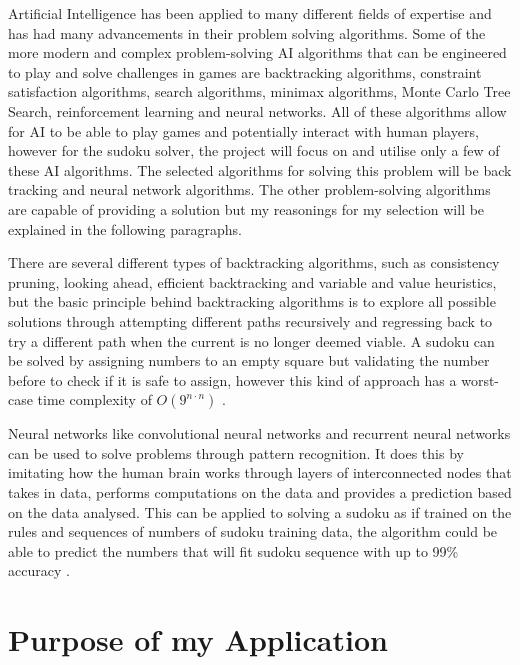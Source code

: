 \documentclass[]{final_report}
\begin{document}
Artificial Intelligence has been applied to many different fields of expertise and has had many advancements in their problem solving algorithms. Some of the more modern and complex problem-solving AI algorithms that can be engineered to play and solve challenges in games are backtracking algorithms, constraint satisfaction algorithms, search algorithms, minimax algorithms, Monte Carlo Tree Search, reinforcement learning and neural networks. All of these algorithms allow for AI to be able to play games and potentially interact with human players, however for the sudoku solver, the project will focus on and utilise only a few of these AI algorithms. The selected algorithms for solving this problem will be back tracking and neural network algorithms. The other problem-solving algorithms are capable of providing a solution but my reasonings for my selection will be explained in the following paragraphs.  

There are several different types of backtracking algorithms, such as consistency pruning, looking ahead, efficient backtracking and variable and value heuristics, but the basic principle behind backtracking algorithms is to explore all possible solutions through attempting different paths recursively and regressing back to try a different path when the current is no longer deemed viable. A sudoku can be solved by assigning numbers to an empty square but validating the number before to check if it is safe to assign, however this kind of approach has a worst-case time complexity of $O(9^{n \cdot n})$ \cite{GeeksforGeeks}. 

Neural networks like convolutional neural networks and recurrent neural networks can be used to solve problems through pattern recognition. It does this by imitating how the human brain works through layers of interconnected nodes that takes in data, performs computations on the data and provides a prediction based on the data analysed. This can be applied to solving a sudoku as if trained on the rules and sequences of numbers of sudoku training data, the algorithm could be able to predict the numbers that will fit sudoku sequence with up to 99\% accuracy \cite{AkinDavid}.

\section{Purpose of my Application}
\end{document}
